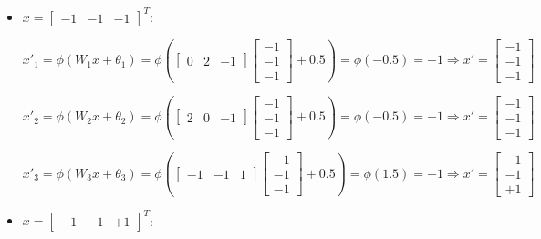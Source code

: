 \documentclass[letterpaper,headings=standardclasses]{scrartcl}
\begin{document}
\begin{itemize}
\item $x = [\begin{matrix} -1 & -1 & -1 \end{matrix}]^T$:

$$ x'_{1} = \phi(W_1 x + \theta_1) = \phi \left( \left[ \begin{matrix} 0 & 2 & -1 \end{matrix} \right] \left[ \begin{matrix} -1 \\ -1 \\ -1 \end{matrix} \right] + 0.5 \right) = \phi \left( -0.5 \right) = -1 \Rightarrow x' = \left[ \begin{matrix} -1 \\ -1 \\ -1 \end{matrix} \right] $$

$$ x'_{2} = \phi(W_2 x + \theta_2) = \phi \left( \left[ \begin{matrix} 2 & 0 & -1 \end{matrix} \right] \left[ \begin{matrix} -1 \\ -1 \\ -1 \end{matrix} \right] + 0.5 \right) = \phi \left( -0.5 \right) = -1 \Rightarrow x' = \left[ \begin{matrix} -1 \\ -1 \\ -1 \end{matrix} \right] $$

$$ x'_{3} = \phi(W_3 x + \theta_3) = \phi \left( \left[ \begin{matrix} -1 & -1 & 1 \end{matrix} \right] \left[ \begin{matrix} -1 \\ -1 \\ -1 \end{matrix} \right] + 0.5 \right) = \phi \left( 1.5 \right) = +1 \Rightarrow x' = \left[ \begin{matrix} -1 \\ -1 \\ +1 \end{matrix} \right] $$

\item $x = [\begin{matrix} -1 & -1 & +1 \end{matrix}]^T$:


\end{itemize}
\end{document}
